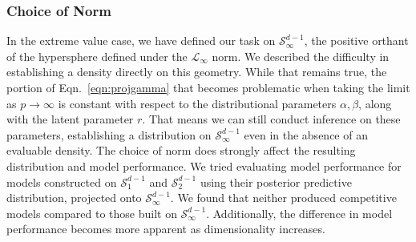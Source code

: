 \subsubsection{Choice of Norm}
In the extreme value case, we have defined our task on $\mathcal{S}_{\infty}^{d-1}$, the positive orthant
  of the hypersphere defined under the $\mathcal{L}_{\infty}$ norm.  We described the difficulty in
  establishing a density directly on this geometry.
  While that remains true, the portion of
  Eqn.~\ref{eqn:projgamma} that becomes problematic when taking the limit as $p\to\infty$ is constant
  with respect to the distributional parameters $\alpha,\beta$, along with the latent parameter $r$.
  That means we can still conduct inference on these parameters, establishing a distribution on
  $\mathcal{S}_{\infty}^{d-1}$ even in the absence of an evaluable density.   The choice of norm does
  strongly affect the resulting distribution and model performance.  We tried evaluating model performance
  for models constructed on $\mathcal{S}_1^{d-1}$ and $\mathcal{S}_2^{d-1}$ using their posterior
  predictive distribution, projected onto $\mathcal{S}_{\infty}^{d-1}$.  We found that neither produced
  competitive models compared to those built on $\mathcal{S}_{\infty}^{d-1}$.  Additionally, the
  difference in model performance becomes more apparent as dimensionality increases.






